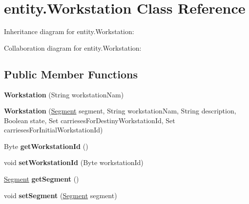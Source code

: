 \hypertarget{classentity_1_1_workstation}{}\section{entity.\+Workstation Class Reference}
\label{classentity_1_1_workstation}


Inheritance diagram for entity.\+Workstation\+:


Collaboration diagram for entity.\+Workstation\+:
\subsection*{Public Member Functions}
\begin{DoxyCompactItemize}
\item 
\mbox{\label{classentity_1_1_workstation_a377e0a2bbe7044cc7f486bae0ea8ed67}} 
{\bfseries Workstation} (String workstation\+Nam)
\item 
\mbox{\label{classentity_1_1_workstation_a22288e3495ba499b6bde23eb07f7101b}} 
{\bfseries Workstation} (\mbox{\hyperlink{classentity_1_1_segment}{Segment}} segment, String workstation\+Nam, String description, Boolean state, Set carrieses\+For\+Destiny\+Workstation\+Id, Set carrieses\+For\+Initial\+Workstation\+Id)
\item 
\mbox{\label{classentity_1_1_workstation_a816f72ae08b89cc3bf428d6de5cb446c}} 
Byte {\bfseries get\+Workstation\+Id} ()
\item 
\mbox{\label{classentity_1_1_workstation_a3d9865f9ae2049641749ffaa4fb733f6}} 
void {\bfseries set\+Workstation\+Id} (Byte workstation\+Id)
\item 
\mbox{\label{classentity_1_1_workstation_a41f03757564ca8adcdc0a062c33f99d4}} 
\mbox{\hyperlink{classentity_1_1_segment}{Segment}} {\bfseries get\+Segment} ()
\item 
\mbox{\label{classentity_1_1_workstation_a419f3d517914ff99b9c3b1a151deaf37}} 
void {\bfseries set\+Segment} (\mbox{\hyperlink{classentity_1_1_segment}{Segment}} segment)
\item 

\end{DoxyCompactItemize}
